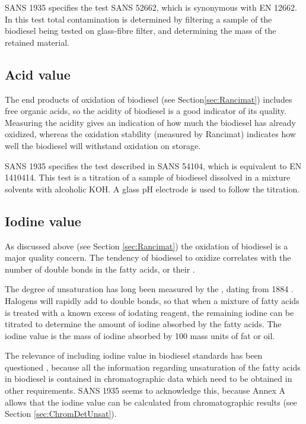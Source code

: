 SANS 1935 specifies the test SANS 52662, which is synonymous with EN 12662. In
this test total contamination is determined by filtering a sample of the
biodiesel being tested on glass-fibre filter, and determining the mass of the
retained material.

\subsection{Acid value}

The end products of oxidation of biodiesel (see Section\ref{sec:Rancimat})
includes free organic acids, so the acidity of biodiesel is a good indicator of
its quality. Measuring the acidity gives an indication of how much the biodiesel
has already oxidized, whereas the oxidation stability (measured by Rancimat)
indicates how well the biodiesel will withstand oxidation on storage.

SANS 1935 specifies the test described in SANS 54104, which is equivalent to EN
1410414. This test is a titration of a sample of biodiesel dissolved in a
mixture solvents with alcoholic KOH. A glass pH electrode is used to follow the
titration.

\subsection{Iodine value}

As discussed above (see Section \ref{sec:Rancimat}) the oxidation of biodiesel
is a major quality concern. The tendency of biodiesel to oxidize correlates with
the number of double bonds in the fatty acids, or their .


The degree of unsaturation has long been measured by the ,
dating from 1884 \autocite{Knothe2007}. Halogens will rapidly add to double
bonds, so that when a mixture of fatty acids is treated with a known excess of
iodating reagent, the remaining iodine can be titrated to determine the amount
of iodine absorbed by the fatty acids. The iodine value is the mass of iodine
absorbed by 100 mass units of fat or oil.

The relevance of including iodine value in biodiesel standards has been
questioned \autocite{Knothe2002}, because all the information regarding
unsaturation of the fatty acids in biodiesel is contained in chromatographic
data which need to be obtained in other requirements. SANS 1935 seems to
acknowledge this, because Annex A allows that the iodine value can be calculated
from chromatographic results (see Section \ref{sec:ChromDetUnsat}).

